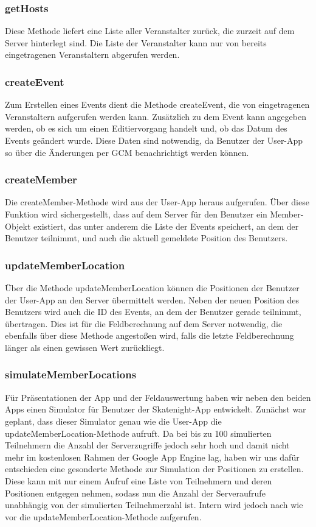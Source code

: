 \subsubsection*{getHosts}
Diese Methode liefert eine Liste aller Veranstalter zurück, die zurzeit auf dem Server hinterlegt sind. Die Liste der Veranstalter kann nur von bereits eingetragenen Veranstaltern abgerufen werden.

\subsubsection*{createEvent}
Zum Erstellen eines Events dient die Methode createEvent, die von eingetragenen Veranstaltern aufgerufen werden kann. Zusätzlich zu dem Event kann angegeben werden, ob es sich um einen Editiervorgang handelt und, ob das Datum des Events geändert wurde. Diese Daten sind notwendig, da Benutzer der User-App so über die Änderungen per GCM benachrichtigt werden können.

\subsubsection*{createMember}
Die createMember-Methode wird aus der User-App heraus aufgerufen. Über diese Funktion wird sichergestellt, dass auf dem Server für den Benutzer ein Member-Objekt existiert, das unter anderem die Liste der Events speichert, an dem der Benutzer teilnimmt, und auch die aktuell gemeldete Position des Benutzers.

\subsubsection*{updateMemberLocation}
Über die Methode updateMemberLocation können die Positionen der Benutzer der User-App an den Server übermittelt werden. Neben der neuen Position des Benutzers wird auch die ID des Events, an dem der Benutzer gerade teilnimmt, übertragen. Dies ist für die Feldberechnung auf dem Server notwendig, die ebenfalls über diese Methode angestoßen wird, falls die letzte Feldberechnung länger als einen gewissen Wert zurückliegt.

\subsubsection*{simulateMemberLocations}
Für Präsentationen der App und der Feldauswertung haben wir neben den beiden Apps einen Simulator für Benutzer der Skatenight-App entwickelt. Zunächst war geplant, dass dieser Simulator genau wie die User-App die updateMemberLocation-Methode aufruft. Da bei bis zu 100 simulierten Teilnehmern die Anzahl der Serverzugriffe jedoch sehr hoch und damit nicht mehr im kostenlosen Rahmen der Google App Engine lag, haben wir uns dafür entschieden eine gesonderte Methode zur Simulation der Positionen zu erstellen. Diese kann mit nur einem Aufruf eine Liste von Teilnehmern und deren Positionen entgegen nehmen, sodass nun die Anzahl der Serveraufrufe unabhängig von der simulierten Teilnehmerzahl ist. Intern wird jedoch nach wie vor die updateMemberLocation-Methode aufgerufen.

